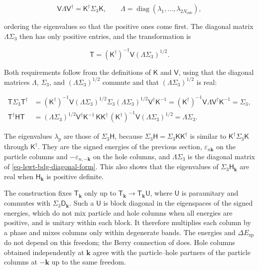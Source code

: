 \[
\mathsf V\Lambda\mathsf V^\dagger=\mathsf K^\dagger\Sigma_3\mathsf K,
\qquad
\Lambda=\operatorname{diag}(\lambda_1,\ldots,\lambda_{2N_{\mathrm{sub}}}),
\]

ordering the eigenvalues so that the positive ones come first. The diagonal matrix \(\Lambda\Sigma_3\) then has only positive entries, and the transformation is

\begin{equation}\label{eq-lswt-colpa-transformation}
\mathsf T=(\mathsf K^\dagger)^{-1}\mathsf V(\Lambda\Sigma_3)^{1/2}.
\end{equation}

Both requirements follow from the definitions of \(\mathsf K\) and \(\mathsf V\), using that the diagonal matrices \(\Lambda\), \(\Sigma_3\), and \((\Lambda\Sigma_3)^{1/2}\) commute and that \((\Lambda\Sigma_3)^{1/2}\) is real:

\[
\begin{aligned}
\mathsf T\Sigma_3\mathsf T^\dagger
&=(\mathsf K^\dagger)^{-1}\mathsf V(\Lambda\Sigma_3)^{1/2}\Sigma_3(\Lambda\Sigma_3)^{1/2}\mathsf V^\dagger\mathsf K^{-1}
=(\mathsf K^\dagger)^{-1}\mathsf V\Lambda\mathsf V^\dagger\mathsf K^{-1}
=\Sigma_3,\\
\mathsf T^\dagger\mathsf H\mathsf T
&=(\Lambda\Sigma_3)^{1/2}\mathsf V^\dagger\mathsf K^{-1}\,\mathsf K\mathsf K^\dagger\,(\mathsf K^\dagger)^{-1}\mathsf V(\Lambda\Sigma_3)^{1/2}
=\Lambda\Sigma_3.
\end{aligned}
\]

The eigenvalues \(\lambda_p\) are those of \(\Sigma_3\mathsf H\), because \(\Sigma_3\mathsf H=\Sigma_3\mathsf K\mathsf K^\dagger\) is similar to \(\mathsf K^\dagger\Sigma_3\mathsf K\) through \(\mathsf K^\dagger\). They are the signed energies of the previous section, \(\varepsilon_{n\mathbf k}\) on the particle columns and \(-\varepsilon_{n,-\mathbf k}\) on the hole columns, and \(\Lambda\Sigma_3\) is the diagonal matrix of \eqref{eq-lswt-bdg-diagonal-form}. This also shows that the eigenvalues of \(\Sigma_3\mathsf H_{\mathbf k}\) are real when \(\mathsf H_{\mathbf k}\) is positive definite.

The construction fixes \(\mathsf T_{\mathbf k}\) only up to \(\mathsf T_{\mathbf k}\to\mathsf T_{\mathbf k}\mathsf U\), where \(\mathsf U\) is paraunitary and commutes with \(\Sigma_3\mathsf D_{\mathbf k}\). Such a \(\mathsf U\) is block diagonal in the eigenspaces of the signed energies, which do not mix particle and hole columns when all energies are positive, and is unitary within each block. It therefore multiplies each column by a phase and mixes columns only within degenerate bands. The energies and \(\Delta E_{\mathrm{zp}}\) do not depend on this freedom; the Berry connection of  does. Hole columns obtained independently at \(\mathbf k\) agree with the particle--hole partners of the particle columns at \(-\mathbf k\) up to the same freedom.

